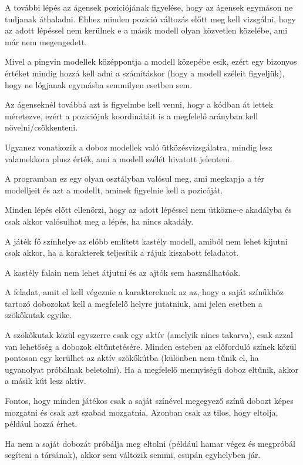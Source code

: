 A további lépés az ágensek poziciójának figyelése, hogy az ágensek egymáson ne tudjanak áthaladni. Ehhez minden pozició változás előtt meg kell vizsgálni, hogy az adott lépéssel nem kerülnek e a másik modell olyan közvetlen közelébe, ami már nem megengedett.

Mivel a pingvin modellek középpontja a modell közepébe esik, ezért egy bizonyos értéket mindig hozzá kell adni a számításkor (hogy a modell széleit figyeljük), hogy ne lógjanak egymásba semmilyen esetben sem. 

Az ágenseknél továbbá azt is figyelmbe kell venni, hogy a kódban át lettek méretezve, ezért a poziciójuk koordinátáit is a megfelelő arányban kell növelni/csökkenteni.

Ugyanez vonatkozik a doboz modellek való ütközésvizsgálatra, mindig lesz valamekkora plusz érték, ami a modell szélét hivatott jelenteni.

A programban ez egy olyan osztályban valósul meg, ami megkapja a tér modelljeit és azt a modellt, aminek figyelnie kell a pozicóját.
 
Minden lépés előtt ellenőrzi, hogy az adott lépéssel nem ütközne-e akadályba és csak akkor valósulhat meg a lépés, ha nincs akadály.


A játék fő színhelye az előbb említett kastély modell, amiből nem lehet kijutni csak akkor, ha a karakterek teljesítik a rájuk kiszabott feladatot.

A kastély falain nem lehet átjutni és az ajtók sem használhatóak.

A feladat, amit el kell végeznie a karaktereknek az az, hogy a saját színűkhöz tartozó dobozokat kell a megfelelő helyre jutatniuk, ami jelen esetben a szökőkutak egyike. 

A szökőkutak közül egyszerre csak egy aktív (amelyik nincs takarva), csak azzal van lehetőség a dobozok eltűntetésére. Minden esteben az előforduló színek közül pontosan egy kerülhet az aktív szökőkútba (különben nem tűnik el, ha ugyanolyat próbálnak beletolni). Ha a megfelelő mennyiségű doboz eltűnik, akkor a másik kút lesz aktív.

Fontos, hogy minden játékos csak a saját színével megegyező színű dobozt képes mozgatni és csak azt szabad mozgatnia. Azonban csak az tilos, hogy eltolja, például hozzá érhet.

Ha nem a saját dobozát próbálja meg eltolni (például hamar végez és megpróbál segíteni a társának), akkor sem változik semmi, csupán egyhelyben jár.

